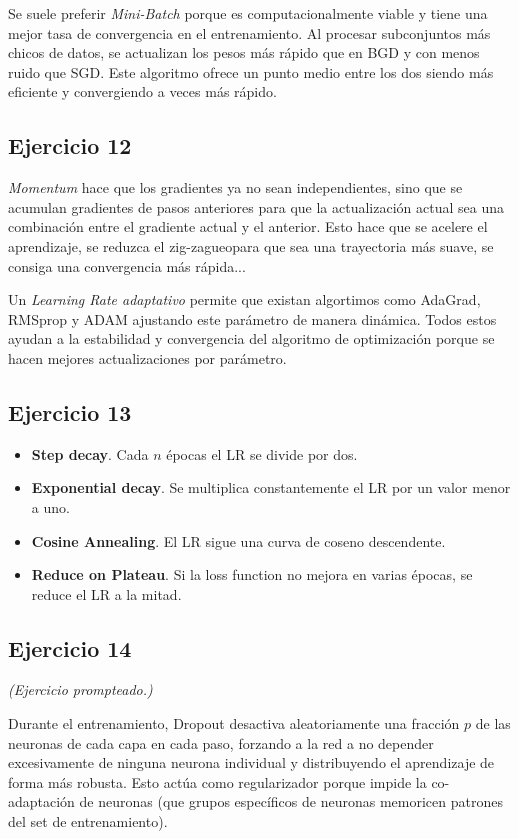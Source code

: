 \documentclass[a4paper,11pt]{article}
\begin{document}
Se suele preferir \textit{Mini-Batch} porque es computacionalmente viable y tiene una mejor tasa de convergencia en el entrenamiento. Al procesar subconjuntos más chicos de datos, se actualizan los pesos más rápido que en BGD y con menos ruido que SGD. Este algoritmo ofrece un punto medio entre los dos siendo más eficiente y convergiendo a veces más rápido.
\subsection*{Ejercicio 12}
\textit{Momentum} hace que los gradientes ya no sean independientes, sino que se acumulan gradientes de pasos anteriores para que la actualización actual sea una combinación entre el gradiente actual y el anterior. Esto hace que se acelere el aprendizaje, se reduzca el zig-zagueopara que sea una trayectoria más suave, se consiga una convergencia más rápida...

Un \textit{Learning Rate adaptativo} permite que existan algortimos como AdaGrad, RMSprop y ADAM ajustando este parámetro de manera dinámica. Todos estos ayudan a la estabilidad y convergencia del algoritmo de optimización porque se hacen mejores actualizaciones por parámetro.
\subsection*{Ejercicio 13}
\begin{itemize}
	\item \textbf{Step decay}. Cada $n$ épocas el LR se divide por dos.
	\item \textbf{Exponential decay}. Se multiplica constantemente el LR por un valor menor a uno.
	\item \textbf{Cosine Annealing}. El LR sigue una curva de coseno descendente.
	\item \textbf{Reduce on Plateau}. Si la loss function no mejora en varias épocas, se reduce el LR a la mitad.
\end{itemize}
\subsection*{Ejercicio 14}
\emph{(Ejercicio prompteado.)}

Durante el entrenamiento, Dropout desactiva aleatoriamente una fracción $p$ de las neuronas de cada capa en cada paso, forzando a la red a no depender excesivamente de ninguna neurona individual y distribuyendo el aprendizaje de forma más robusta. Esto actúa como regularizador porque impide la co-adaptación de neuronas (que grupos específicos de neuronas memoricen patrones del set de entrenamiento).
\end{document}
